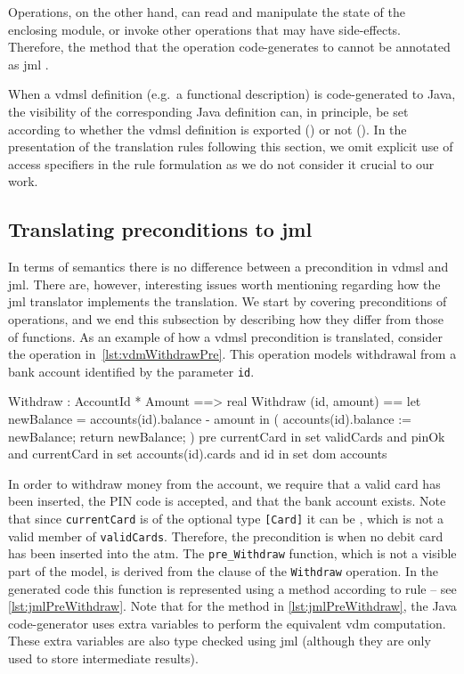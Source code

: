 Operations, on the other hand, can read and manipulate the state of
the enclosing module, or invoke other operations that may have
side-effects. Therefore, the method that the operation code-generates
to cannot be annotated as \ac{jml} .

When a \ac{vdmsl} definition (e.g.\ a functional description) is
code-generated to Java, the visibility of the corresponding Java
definition can, in principle, be set according to whether the
\ac{vdmsl} definition is exported () or not
(). In the presentation of the translation rules following
this section, we omit explicit use of access specifiers in the rule
formulation as we do not consider it crucial to our work.

\subsection{Translating preconditions to \ac{jml}}

In terms of semantics there is no difference between a precondition in
\ac{vdmsl} and \ac{jml}. There are, however, interesting issues worth
mentioning regarding how the \ac{jml} translator implements the
translation. We start by covering preconditions of operations, and we
end this subsection by describing how they differ from those of
functions. As an example of how a \ac{vdmsl} precondition is
translated, consider the operation
in~\autoref{lst:vdmWithdrawPre}. This operation models withdrawal from
a bank account identified by the parameter \texttt{id}.

\begin{vdmsl}[style=customVdm,caption={\ac{vdmsl} operation for bank
account withdrawal guarded by a precondition.},label={lst:vdmWithdrawPre}]
Withdraw : AccountId * Amount ==> real
Withdraw (id, amount) ==
let newBalance =
    accounts(id).balance - amount
in (
 accounts(id).balance := newBalance;
 return newBalance;
)
pre
currentCard in set validCards and pinOk and
currentCard in set accounts(id).cards and
id in set dom accounts
\end{vdmsl}

In order to withdraw money from the account, we require that a valid
card has been inserted, the PIN code is accepted, and that the bank
account exists. Note that since \texttt{currentCard} is of the
optional type \texttt{[Card]} it can be , which is not a valid
member of \texttt{validCards}. Therefore, the precondition is
 when no debit card has been inserted into the \ac{atm}. The
\texttt{pre\_Withdraw} function, which is not a visible part of the
model, is derived from the  clause of the \texttt{Withdraw}
operation. In the generated code this function is represented using a
 method according to rule  -- see
\autoref{lst:jmlPreWithdraw}. Note that for the method in
\autoref{lst:jmlPreWithdraw}, the Java code-generator uses extra
variables to perform the equivalent \ac{vdm} computation. These extra
variables are also type checked using \ac{jml} (although they are only
used to store intermediate results).

